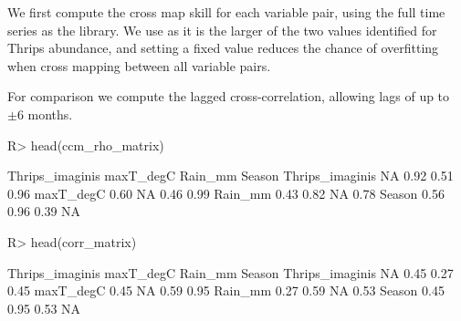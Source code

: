 \documentclass[article]{jss}
\begin{document}
We first compute the cross map skill for each variable pair, using the full time series as the library. We use  as it is the larger of the two values identified for Thrips abundance, and setting a fixed value reduces the chance of overfitting when cross mapping between all variable pairs.

\begin{Schunk}
\end{Schunk}

For comparison we compute the lagged cross-correlation, allowing lags of up to $\pm 6$ months.

\begin{Schunk}
\end{Schunk}

\begin{Schunk}
\begin{Sinput}
R> head(ccm_rho_matrix)
\end{Sinput}
\begin{Soutput}
                Thrips_imaginis maxT_degC Rain_mm Season
Thrips_imaginis              NA      0.92    0.51   0.96
maxT_degC                  0.60        NA    0.46   0.99
Rain_mm                    0.43      0.82      NA   0.78
Season                     0.56      0.96    0.39     NA
\end{Soutput}
\begin{Sinput}
R> head(corr_matrix)
\end{Sinput}
\begin{Soutput}
                Thrips_imaginis maxT_degC Rain_mm Season
Thrips_imaginis              NA      0.45    0.27   0.45
maxT_degC                  0.45        NA    0.59   0.95
Rain_mm                    0.27      0.59      NA   0.53
Season                     0.45      0.95    0.53     NA
\end{Soutput}
\end{Schunk}
\end{document}
